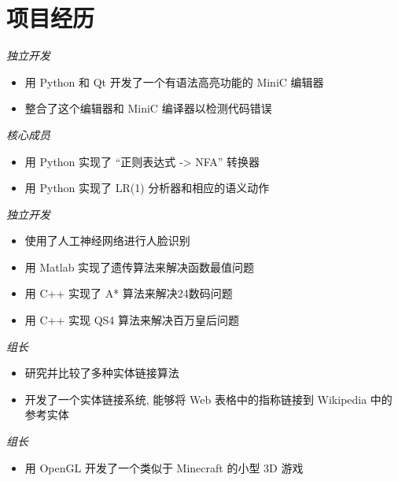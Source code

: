 \section{项目经历}
\textit{独立开发}
\begin{itemize}
  \item 用 Python 和 Qt 开发了一个有语法高亮功能的 MiniC 编辑器
  \item 整合了这个编辑器和 MiniC 编译器以检测代码错误
\end{itemize}

\textit{核心成员}
\begin{itemize}
  \item 用 Python 实现了 ``正则表达式 -> NFA'' 转换器
  \item 用 Python 实现了 LR(1) 分析器和相应的语义动作
\end{itemize}

\textit{独立开发}
\begin{itemize}
  \item 使用了人工神经网络进行人脸识别
  \item 用 Matlab 实现了遗传算法来解决函数最值问题
  \item 用 C++ 实现了 A* 算法来解决24数码问题
  \item 用 C++ 实现 QS4 算法来解决百万皇后问题
\end{itemize}

\textit{组长}
\begin{itemize}
  \item 研究并比较了多种实体链接算法
  \item 开发了一个实体链接系统, 能够将 Web 表格中的指称链接到 Wikipedia 中的参考实体
\end{itemize}

\textit{组长}
\begin{itemize}
  \item 用 OpenGL 开发了一个类似于 Minecraft 的小型 3D 游戏
\end{itemize}

